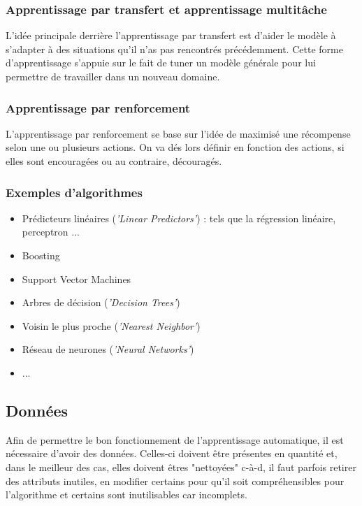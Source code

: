 \documentclass[a4paper]{article}
\begin{document}
\subsubsection{Apprentissage par transfert et apprentissage multitâche}
L'idée principale derrière l'apprentissage par transfert est d'aider le modèle à s'adapter à des situations qu'il n'as pas rencontrés précédemment. Cette forme d'apprentissage s'appuie sur le fait de tuner un modèle générale pour lui permettre de travailler dans un nouveau domaine.

\subsubsection{Apprentissage par renforcement}
L'apprentissage par renforcement se base sur l'idée de maximisé une récompense selon une ou plusieurs actions. On va dés lors définir en fonction des actions, si elles sont encouragées ou au contraire, découragés.

\subsubsection{Exemples d'algorithmes}

\begin{itemize}
	\item Prédicteurs linéaires (\textit{'Linear Predictors'}) : tels que la régression linéaire, perceptron ...
	\item Boosting
	\item Support Vector Machines
	\item Arbres de décision (\textit{'Decision Trees'})
	\item Voisin le plus proche (\textit{'Nearest Neighbor'})
	\item Réseau de neurones (\textit{'Neural Networks'})
	\item ...
\end{itemize}

\newpage

\subsection{Données}
\label{Data}
Afin de permettre le bon fonctionnement de l'apprentissage automatique, il est nécessaire d'avoir des données. Celles-ci doivent être présentes en quantité et, dans le meilleur des cas, elles doivent êtres "nettoyées" c-à-d, il faut parfois retirer des attributs inutiles, en modifier certains pour qu'il soit compréhensibles pour l'algorithme et certains sont inutilisables car incomplets.
\end{document}
